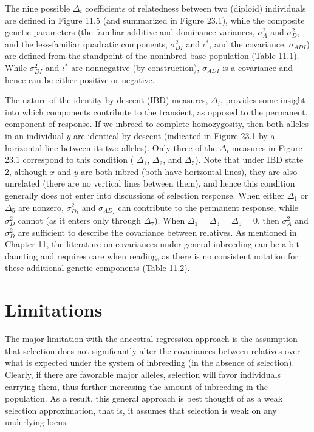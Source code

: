 \documentclass{article}
\begin{document}
The nine possible  $ \Delta_i $ coefficients of relatedness between two (diploid) individuals are defined in Figure 11.5 (and summarized in Figure 23.1), while the composite genetic parameters (the familiar additive and dominance variances,  $ \sigma_A^2 $ and  $ \sigma_D^2 $, and the less-familiar quadratic components,  $ \sigma_{DI}^2 $ and  $ \iota^* $, and the covariance,  $ \sigma_{ADI} $) are defined from the standpoint of the noninbred base population (Table 11.1). While  $ \sigma_{DI}^2 $ and  $ \iota^* $ are nonnegative (by construction),  $ \sigma_{ADI} $ is a covariance and hence can be either positive or negative.

The nature of the identity-by-descent (IBD) measures,  $ \Delta_i $, provides some insight into which components contribute to the transient, as opposed to the permanent, component of response. If we inbreed to complete homozygosity, then both alleles in an individual  $ y $ are identical by descent (indicated in Figure 23.1 by a horizontal line between its two alleles). Only three of the  $ \Delta_i $ measures in Figure 23.1 correspond to this condition ( $ \Delta_1 $,  $ \Delta_2 $, and  $ \Delta_5 $). Note that under IBD state 2, although  $ x $ and  $ y $ are both inbred (both have horizontal lines), they are also unrelated (there are no vertical lines between them), and hence this condition generally does not enter into discussions of selection response. When either  $ \Delta_1 $ or  $ \Delta_5 $ are nonzero,  $ \sigma_{D_I}^2 $ and  $ \sigma_{AD_I} $ can contribute to the permanent response, while  $ \sigma_D^2 $ cannot (as it enters only through  $ \Delta_7 $). When  $ \Delta_1 = \Delta_3 = \Delta_5 = 0 $, then  $ \sigma_A^2 $ and  $ \sigma_D^2 $ are sufficient to describe the covariance between relatives. As mentioned in Chapter 11, the literature on covariances under general inbreeding can be a bit daunting and requires care when reading, as there is no consistent notation for these additional genetic components (Table 11.2).

\section{Limitations}
The major limitation with the ancestral regression approach is the assumption that selection does not significantly alter the covariances between relatives over what is expected under the system of inbreeding (in the absence of selection). Clearly, if there are favorable major alleles, selection will favor individuals carrying them, thus further increasing the amount of inbreeding in the population. As a result, this general approach is best thought of as a weak selection approximation, that is, it assumes that selection is weak on any underlying locus.
\end{document}
